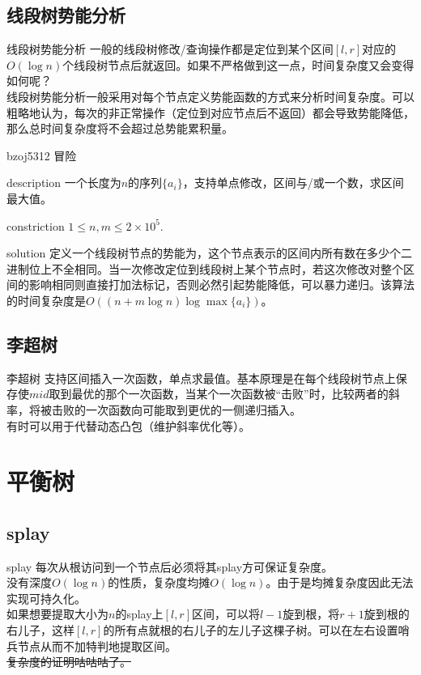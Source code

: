 \documentclass{beamer}
\begin{document}
	\subsection{线段树势能分析}
	\begin{frame}{线段树势能分析}
		一般的线段树修改/查询操作都是定位到某个区间$[l,r]$对应的$O(\log n)$个线段树节点后就返回。如果不严格做到这一点，时间复杂度又会变得如何呢？\\
		
		线段树势能分析一般采用对每个节点定义势能函数的方式来分析时间复杂度。可以粗略地认为，每次的非正常操作（定位到对应节点后不返回）都会导致势能降低，那么总时间复杂度将不会超过总势能累积量。
		
	\end{frame}
	\begin{frame}{bzoj5312 冒险}
		\begin{block}{description}
			一个长度为$n$的序列$\{a_i\}$，支持单点修改，区间与/或一个数，求区间最大值。
		\end{block}
		\begin{block}{constriction}
			$1 \le n, m \le 2\times 10^5.$
		\end{block}
		\pause
		\begin{block}{solution}
			定义一个线段树节点的势能为，这个节点表示的区间内所有数在多少个二进制位上不全相同。当一次修改定位到线段树上某个节点时，若这次修改对整个区间的影响相同则直接打加法标记，否则必然引起势能降低，可以暴力递归。该算法的时间复杂度是$O((n+m\log n)\log\max\{a_i\})$。
		\end{block}
	\end{frame}
	\subsection{李超树}
	\begin{frame}{李超树}
		支持区间插入一次函数，单点求最值。基本原理是在每个线段树节点上保存使$mid$取到最优的那个一次函数，当某个一次函数被“击败”时，比较两者的斜率，将被击败的一次函数向可能取到更优的一侧递归插入。\\
		
		有时可以用于代替动态凸包（维护斜率优化等）。
	\end{frame}
	\section{平衡树}
	\subsection{splay}
	\begin{frame}{splay}
		每次从根访问到一个节点后必须将其splay方可保证复杂度。\\
		
		没有深度$O(\log n)$的性质，复杂度均摊$O(\log n)$。由于是均摊复杂度因此无法实现可持久化。\\
		
		如果想要提取大小为$n$的splay上$[l,r]$区间，可以将$l-1$旋到根，将$r+1$旋到根的右儿子，这样$[l,r]$的所有点就根的右儿子的左儿子这棵子树。可以在左右设置哨兵节点从而不加特判地提取区间。\\
		
		\sout{复杂度的证明咕咕咕了。}
	\end{frame}
\end{document}
